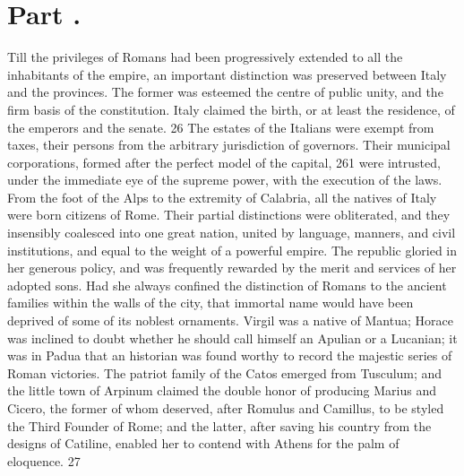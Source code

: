 \section{Part \thesection.}
\thispagestyle{simple}

Till the privileges of Romans had been progressively extended to
all the inhabitants of the empire, an important distinction was
preserved between Italy and the provinces. The former was
esteemed the centre of public unity, and the firm basis of the
constitution. Italy claimed the birth, or at least the residence,
of the emperors and the senate. 26 The estates of the Italians
were exempt from taxes, their persons from the arbitrary
jurisdiction of governors. Their municipal corporations, formed
after the perfect model of the capital, 261 were intrusted, under
the immediate eye of the supreme power, with the execution of the
laws. From the foot of the Alps to the extremity of Calabria, all
the natives of Italy were born citizens of Rome. Their partial
distinctions were obliterated, and they insensibly coalesced into
one great nation, united by language, manners, and civil
institutions, and equal to the weight of a powerful empire. The
republic gloried in her generous policy, and was frequently
rewarded by the merit and services of her adopted sons. Had she
always confined the distinction of Romans to the ancient families
within the walls of the city, that immortal name would have been
deprived of some of its noblest ornaments. Virgil was a native of
Mantua; Horace was inclined to doubt whether he should call
himself an Apulian or a Lucanian; it was in Padua that an
historian was found worthy to record the majestic series of Roman
victories. The patriot family of the Catos emerged from Tusculum;
and the little town of Arpinum claimed the double honor of
producing Marius and Cicero, the former of whom deserved, after
Romulus and Camillus, to be styled the Third Founder of Rome; and
the latter, after saving his country from the designs of
Catiline, enabled her to contend with Athens for the palm of
eloquence. 27



